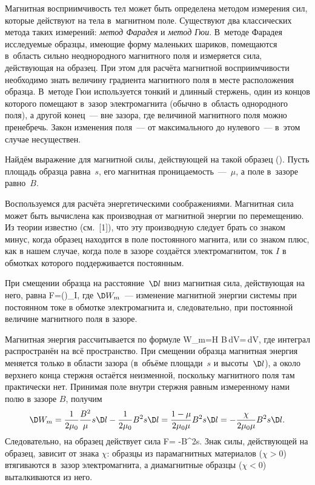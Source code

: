 


Магнитная восприимчивость тел может быть определена методом измерения сил, которые действуют на тела в~магнитном поле.
Существуют два классических метода таких измерений: \emph{метод Фарадея} и \emph{метод Гюи}. В~методе Фарадея
исследуемые образцы, имеющие форму маленьких шариков, помещаются в~область сильно неоднородного магнитного поля и
измеряется сила, действующая на образец. При этом для расчёта магнитной восприимчивости необходимо знать величину
градиента магнитного поля в месте расположения образца. В~методе Гюи используется тонкий и длинный стержень, один из
концов которого помещают в~зазор электромагнита (обычно в~область однородного поля), а другой конец~--- вне зазора, где
величиной магнитного поля можно пренебречь. Закон изменения поля~--- от максимального до нулевого~--- в~этом случае
несуществен.


Найдём выражение для магнитной силы, действующей на такой образец (). Пусть площадь образца равна~$s$, его магнитная
проницаемость~---~$\mu$, а поле в~зазоре равно~$B$.

Воспользуемся для расчёта энергетическими соображениями. Магнитная сила может быть вычислена как производная от
магнитной энергии по перемещению. Из теории известно (см.~[1]), что эту производную следует брать со знаком минус, когда
образец находится в поле постоянного магнита, или со знаком плюс, как в нашем случае, когда поле в зазоре создаётся
электромагнитом, ток $I$ в обмотках которого поддерживается постоянным.

При смещении образца на расстояние~$\D l$ вниз магнитная сила, действующая на него, равна
F=\left(\right)_I,
\ee
где $\D W_m$~--- изменение магнитной энергии системы при постоянном токе в обмотке электромагнита и, следовательно, при
постоянной величине магнитного поля в зазоре.

Магнитная энергия рассчитывается по формуле
W_m=\int H B\,dV=\int{}\,dV,
\ee
где интеграл распространён на всё пространство. При смещении образца магнитная энергия меняется только в области зазора
(в~объёме площади~$s$ и высоты~$\D l$), а около верхнего конца стержня остаётся неизменной, поскольку магнитного поля там
практически нет. Принимая поле внутри стержня равным измеренному нами полю в зазоре $B$, получим
\[
\D W_m=\frac{1}{2\mu_0}\frac{B^2}{\mu}s\D l-\frac{1}{2\mu_0}B^2 s\D l=\frac{1-\mu}{2\mu_0\mu}B^2s\D
l=-\frac{\chi}{2\mu_0\mu}B^2s\D l.
\]
Следовательно, на образец действует сила
F=%
-\frac{\chi}{2\mu_0\mu}B^2s.
\ee
Знак силы, действующей на образец, зависит от знака $\chi$: образцы из парамагнитных материалов ($\chi>0$) втягиваются
в~зазор электромагнита, а диамагнитные образцы ($\chi<0$) выталкиваются  из него.

